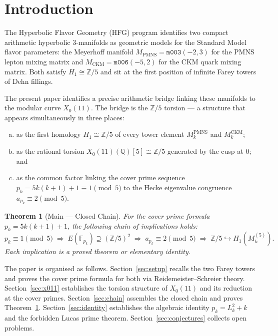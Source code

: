 \documentclass[11pt,a4paper]{article}
\newtheorem{theorem}{Theorem}[section]
\theoremstyle{definition}
\newcommand{\ZZ}{\mathbb{Z}}
\newcommand{\QQ}{\mathbb{Q}}
\newcommand{\FF}{\mathbb{F}}
\newcommand{\MPMNS}{M_{\mathrm{PMNS}}}
\newcommand{\MCKM}{M_{\mathrm{CKM}}}
\newcommand{\pk}{p_k}
\newcommand{\Xo}{X_0(11)}
\newcommand{\Ek}{E(\FF_{\pk})}
\begin{document}
\section{Introduction}
\label{sec:intro}

The Hyperbolic Flavor Geometry (HFG) program
\cite{GentrySSRN,GentryEM,GentryFarey}
identifies two compact arithmetic hyperbolic 3-manifolds
as geometric models for the Standard Model flavor parameters:
the Meyerhoff manifold $\MPMNS = \texttt{m003}(-2,3)$
for the PMNS lepton mixing matrix and
$\MCKM = \texttt{m006}(-5,2)$ for the CKM quark mixing matrix.
Both satisfy $H_1 \cong \ZZ/5$ and sit at the first position
of infinite Farey towers of Dehn fillings.

The present paper identifies a precise arithmetic bridge
linking these manifolds to the modular curve $\Xo$.
The bridge is the $\ZZ/5$ torsion --- a structure that appears
simultaneously in three places:
\begin{enumerate}[(a)]
\item as the first homology $H_1 \cong \ZZ/5$ of every tower element
      $M_k^{\mathrm{PMNS}}$ and $M_k^{\mathrm{CKM}}$;
\item as the rational torsion $\Xo(\QQ)[5] \cong \ZZ/5$
      generated by the cusp at $0$; and
\item as the common factor linking the cover prime sequence
      $\pk = 5k(k+1)+1 \equiv 1 \pmod{5}$ to the Hecke
      eigenvalue congruence $a_{\pk} \equiv 2 \pmod{5}$.
\end{enumerate}

\begin{theorem}[Main --- Closed Chain]
\label{thm:main}
For the cover prime formula $\pk = 5k(k+1)+1$, the following
chain of implications holds:
\[
  \pk \equiv 1 \pmod{5}
  \;\Rightarrow\;
  \Ek \supseteq (\ZZ/5)^2
  \;\Rightarrow\;
  a_{\pk} \equiv 2 \pmod{5}
  \;\Rightarrow\;
  \ZZ/5 \hookrightarrow H_1(M_k^{(5)}).
\]
Each implication is a proved theorem or elementary identity.
\end{theorem}

The paper is organised as follows.
Section~\ref{sec:setup} recalls the two Farey towers and proves
the cover prime formula for both via Reidemeister--Schreier theory.
Section~\ref{sec:x011} establishes the torsion structure of $\Xo$
and its reduction at the cover primes.
Section~\ref{sec:chain} assembles the closed chain and proves
Theorem~\ref{thm:main}.
Section~\ref{sec:identity} establishes the algebraic identity
$\pk = L_k^2 + k$ and the forbidden Lucas prime theorem.
Section~\ref{sec:conjectures} collects open problems.
\end{document}
